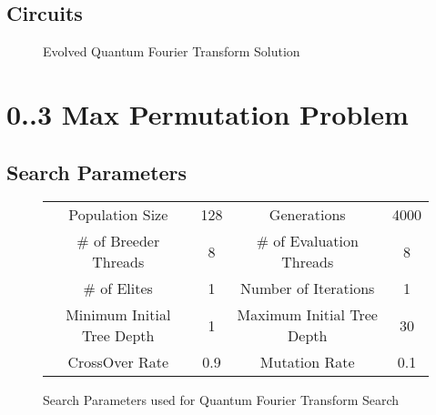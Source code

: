 \subsection{Circuits}
\label{sec:evoqftcir}
\begin{figure}[h!]
\caption{Evolved Quantum Fourier Transform Solution}
\label{fig:appevoqftsol}
\end{figure}

\clearpage
\section{0..3 Max Permutation Problem}
\label{sec:maxpermsol}

\subsection{Search Parameters}
\label{sec:qftsearchparams}

\begin{figure}[h!]
\begin{center}
 \begin{tabular}{|cc|cc|}
\hline
  Population Size & 128 & Generations & 4000 \\
  \# of Breeder Threads & 8 & \# of Evaluation Threads & 8 \\
  \# of Elites & 1 & Number of Iterations & 1 \\
  Minimum Initial Tree Depth & 1 & Maximum Initial Tree Depth & 30 \\
  CrossOver Rate & 0.9 & Mutation Rate & 0.1 \\
\hline
 \end{tabular}

\end{center}
\caption{Search Parameters used for Quantum Fourier Transform Search}
\label{fig:qftparams}
\end{figure}

